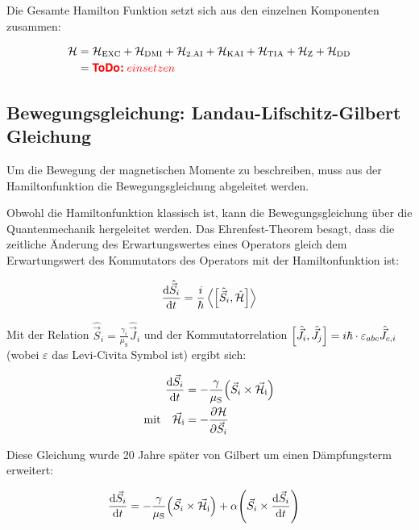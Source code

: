 \documentclass[main.tex]{subfiles}
\begin{document}
Die Gesamte Hamilton Funktion setzt sich aus den einzelnen Komponenten zusammen:

\begin{align}
	\mathcal{H} & = \mathcal{H}_{\text{EXC}} + \mathcal{H}_{\text{DMI}} +
	\mathcal{H}_{\text{2.AI}} + \mathcal{H}_{\text{KAI}} +
	\mathcal{H}_{\text{TIA}} + \mathcal{H}_{\text{Z}} +
	\mathcal{H}_{\text{DD}}\label{eq:hamilton}\\
	&= \todo{einsetzen}
\end{align}

\subsection{Bewegungsgleichung: Landau-Lifschitz-Gilbert Gleichung}
Um die Bewegung der magnetischen Momente zu beschreiben, muss aus der
Hamiltonfunktion die Bewegungsgleichung abgeleitet werden.

Obwohl die Hamiltonfunktion klassisch ist, kann die Bewegungsgleichung über die
Quantenmechanik hergeleitet werden. Das Ehrenfest-Theorem besagt, dass die
zeitliche Änderung des Erwartungswertes eines Operators gleich dem
Erwartungswert des Kommutators des Operators mit der Hamiltonfunktion ist:

\begin{align}
	\dv{\hat{\vec{S}}_i}{t} = \frac{i}{\hbar} \expval{\qty[\hat{\vec{S}}_i,
			\hat{\mathcal{H}}]}
\end{align}\cite{qm-1-Schwabl}

Mit der Relation \(\hat{\vec{S}}_i = \frac{\gamma_i}{\mu_{\text{S}}}
\hat{\vec{J}}_i\) und der Kommutatorrelation \(\qty[\hat{\vec{J}}_i,
	\hat{\vec{J}}_j] = i \hbar \cdot \varepsilon_{abc}
\hat{\vec{J}}_{c,i}\) (wobei
\(\varepsilon\) das Levi-Civita Symbol ist) ergibt sich:

\begin{align}
	\dv{\vec{S}_i}{t}                             & = -\frac{\gamma
	}{\mu_{\text{S}}}
	\qty(\vec{S}_i \times
	\vec{\mathcal{H}}_{\text{i}})\label{eq:landau-lifschitz}
	\\
	\text{mit} \quad \vec{\mathcal{H}}_{\text{i}} & = -
	\pdv{\mathcal{H}}{\vec{S}_i}
\end{align}\cite{landau-lifshitz}

Diese Gleichung wurde 20 Jahre später von Gilbert um einen Dämpfungsterm
erweitert:

\begin{align}
	\dv{\vec{S}_i}{t} & = -\frac{\gamma }{\mu_{\text{S}}}\qty(\vec{S}_i
	\times
	\vec{\mathcal{H}}_{\text{i}}) + \alpha \qty(\vec{S}_i \times
	\dv{\vec{S}_i}{t})
\end{align}\cite{Gilbert-damping}
\end{document}
